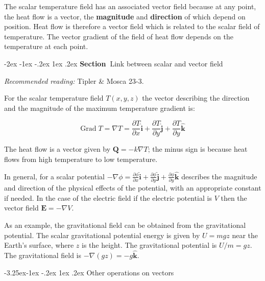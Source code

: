 \documentclass[
]{book}
\makeatletter
\renewcommand\section{%
\@startsection{section}{1}{\z@}%
              {-2ex \@plus -1ex \@minus -.2ex}%
              {1ex \@plus .2ex}%
              {\sffamily\bfseries\large\noindent Section~}}
\renewcommand\subsection{%
\@startsection{subsection}{2}{\z@}%
              {-3.25ex\@plus -1ex \@minus -.2ex}%
              {1ex \@plus .2ex}%
              {\sffamily\bfseries}}
\numberwithin{equation}{section}
\makeatother
\begin{document}
The scalar temperature field has an associated vector field because at
any point, the heat flow is a vector, the \textbf{magnitude} and
\textbf{direction} of which depend on position. Heat flow is therefore a
vector field which is related to the scalar field of temperature. The
vector gradient of the field of heat flow depends on the temperature at
each point.

\hypertarget{link-between-scalar-and-vector-field}{%
\section{Link between scalar and vector field}\label{link-between-scalar-and-vector-field}}

\emph{Recommended reading:} Tipler \& Mosca 23-3.

For the scalar temperature field \(T(x,y,z)\) the vector describing the
direction and the magnitude of the maximum temperature gradient is:

\begin{equation}
\label{eq:tempGrad}
 \text{Grad} \; T = \nabla T = \frac{\partial T} {\partial x} \hat{\mathbf{i}} + \frac{\partial T}{\partial y} \hat{\mathbf{j}} + \frac{\partial T}{\partial y} \hat{\mathbf{k}}
\end{equation}

The heat flow is a vector given by \(\mathbf{Q} = -k \nabla T\); the minus sign is
because heat flows from high temperature to low temperature.

In general, for a scalar potential
\(-\nabla \phi = \frac{\partial \phi} {\partial x} \hat{\mathbf{i}} + \frac{\partial \phi}{\partial y} \hat{\mathbf{j}} + \frac{\partial \phi}{\partial y} \hat{\mathbf{k}}\)
describes the magnitude and direction of the physical effects of the
potential, with an appropriate constant if needed. In the case of the
electric field if the electric potential is \(V\) then the vector field
\(\mathbf{E} = -\nabla V\).

As an example, the gravitational field can be obtained from the
gravitational potential. The scalar gravitational potential energy is
given by \(U = mgz\) near the Earth's surface, where \(z\) is the height.
The gravitational potential is \(U/m = gz\). The gravitational field is
\(-\nabla(gz)=-g \hat{\mathbf{k}}\).

\hypertarget{other-operations-on-vectors}{%
\subsection{Other operations on vectors}\label{other-operations-on-vectors}}
\end{document}
